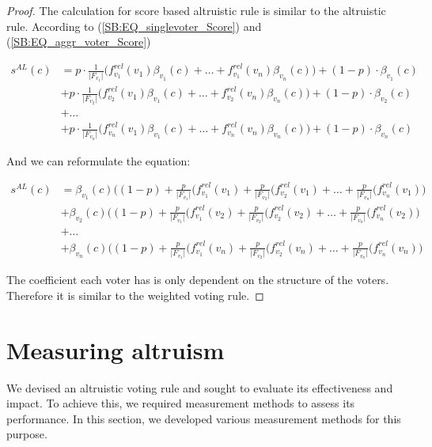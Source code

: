 \documentclass{article}
\begin{document}
\begin{proof}
    
The calculation for score based altruistic rule is similar to the altruistic rule. According to   (\ref{SB:EQ_singlevoter_Score}) and    (\ref{SB:EQ_aggr_voter_Score})

\begin{equation*}
\begin{split}
s^{AL}(c) &= p \cdot \frac{1}{\vert F_{v_1}\vert}\big(f_{v_1}^{rel}(v_1)\beta_{v_1}(c) + \dots + f_{v_1}^{rel}(v_n)\beta_{v_n}(c)\big) + (1-p) \cdot \beta_{v_1}(c)\\
            &+ p \cdot \frac{1}{\vert F_{v_2}\vert}\big(f_{v_2}^{rel}(v_1)\beta_{v_1}(c) + \dots + f_{v_2}^{rel}(v_n)\beta_{v_n}(c)\big) + (1-p) \cdot \beta_{v_2}(c) \\
            &+ \dots \\ 
            &+ p \cdot \frac{1}{\vert F_{v_n}\vert}\big(f_{v_n}^{rel}(v_1)\beta_{v_1}(c) + \dots + f_{v_n}^{rel}(v_n)\beta_{v_n}(c)\big) +    (1-p) \cdot \beta_{v_n}(c)
\end{split}
\end{equation*}

And we can reformulate the equation:


\begin{equation*}
\begin{split}
s^{AL}(c) &= \beta_{v_1}(c)\big((1-p)+\frac{p}{\vert F_{v_1}\vert}(f_{v_1}^{rel}(v_1) +  \frac{p}{\vert F_{v_2}\vert}(f_{v_2}^{rel}(v_1)+ \dots +\frac{p}{\vert F_{v_n}\vert}(f_{v_n}^{rel}(v_1)\big) \\
            &+ \beta_{v_2}(c)\big((1-p)+\frac{p}{\vert F_{v_1}\vert}(f_{v_1}^{rel}(v_2) +  \frac{p}{\vert F_{v_2}\vert}(f_{v_2}^{rel}(v_2)+ \dots +\frac{p}{\vert F_{v_n}\vert}(f_{v_n}^{rel}(v_2)\big) \\
            &+  \dots  \\
            &+ \beta_{v_n}(c)\big((1-p)+\frac{p}{\vert F_{v_1}\vert}(f_{v_1}^{rel}(v_n) +  \frac{p}{\vert F_{v_2}\vert}(f_{v_2}^{rel}(v_n)+ \dots +\frac{p}{\vert F_{v_n}\vert}(f_{v_n}^{rel}(v_n)\big) 
\end{split}
\end{equation*}

The coefficient each voter has is only dependent on the structure of the voters. Therefore it is similar to the weighted voting rule.
\end{proof}

\section{Measuring altruism}
We devised an altruistic voting rule and sought to evaluate its effectiveness and impact. To achieve this, we required measurement methods to assess its performance. In this section, we developed various measurement methods for this purpose.
\end{document}
